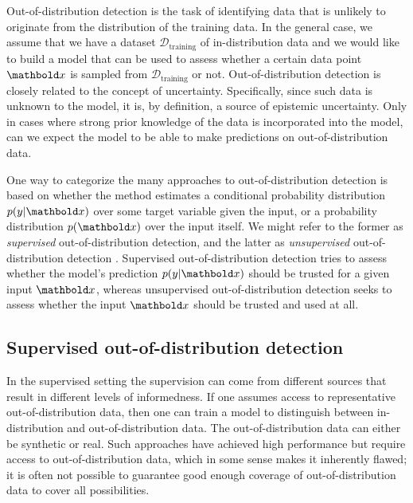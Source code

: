 Out-of-distribution detection is the task of identifying data that is unlikely to originate from the distribution of the training data. 
In the general case, we assume that we have a dataset $\mathcal{D}_{\text{training}}$ of in-distribution data and we would like to build a model that can be used to assess whether a certain data point $\xb$ is sampled from $\mathcal{D}_{\text{training}}$ or not. 
Out-of-distribution detection is closely related to the concept of uncertainty. Specifically, since such data is unknown to the model, it is, by definition, a source of epistemic uncertainty. Only in cases where strong prior knowledge of the data is incorporated into the model, can we expect the model to be able to make predictions on out-of-distribution data.

One way to categorize the many approaches to out-of-distribution detection is based on whether the method estimates a conditional probability distribution $p(y|\xb)$ over some target variable given the input, or a probability distribution $p(\xb)$ over the input itself. We might refer to the former as \emph{supervised} out-of-distribution detection, and the latter as \emph{unsupervised} out-of-distribution detection \cite{graham_denoising_2023,liu_unsupervised_2023a}. Supervised out-of-distribution detection tries to assess whether the model's prediction $p(y|\xb)$ should be trusted for a given input $\xb$, whereas unsupervised out-of-distribution detection seeks to assess whether the input $\xb$ should be trusted and used at all.

\subsection{Supervised out-of-distribution detection}

In the supervised setting the supervision can come from different sources that result in different levels of informedness. 
If one assumes access to representative out-of-distribution data, then one can train a model to distinguish between in-distribution and out-of-distribution data. 
The out-of-distribution data can either be synthetic or real.
Such approaches have achieved high performance \cite{lee_training_2018,hendrycks_deep_2019,ruff_deep_2020} but require access to out-of-distribution data, which in some sense makes it inherently flawed; it is often not possible to guarantee good enough coverage of out-of-distribution data to cover all possibilities. 

